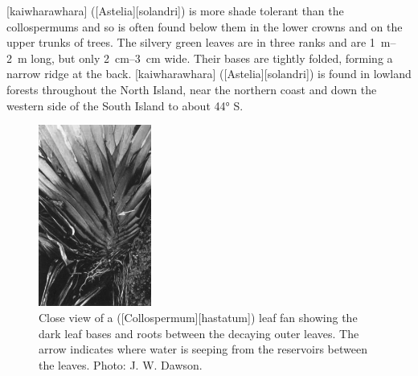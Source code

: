 [kaiwharawhara] ([Astelia][solandri]) is more shade tolerant than the collospermums and so is often found below them in the lower crowns and on the upper trunks of trees.
The silvery green leaves are in three ranks and are \SIrange{1}{2}{\metre} long, but only \SIrange{2}{3}{\centi\metre} wide.
Their bases are tightly folded, forming a narrow ridge at the back.
[kaiwharawhara] ([Astelia][solandri]) is found in lowland forests throughout the North Island, near the northern coast and down the western side of the South Island to about \ang{44} S.

\begin{figure}
	\includegraphics[width=0.33\textwidth]{graphics/fig_041}
	\centering
	\caption[Close view of a tank lily (\emph{Collospermum hastatum}) leaf fan]{Close view of a  ([Collospermum][hastatum]) leaf fan showing the dark leaf bases and roots between the decaying outer leaves.
	The arrow indicates where water is seeping from the reservoirs between the leaves.
	Photo: J. W. Dawson.}%
	\label{fig:41collospermum}
\end{figure}

